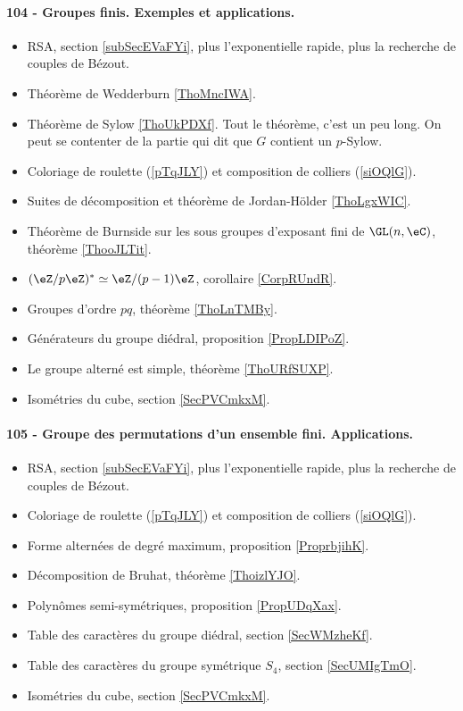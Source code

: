 \paragraph{104 - Groupes finis. Exemples et applications.}
\begin{itemize}
    \item RSA, section \ref{subSecEVaFYi}, plus l'exponentielle rapide, plus la recherche de couples de Bézout.
    \item Théorème de Wedderburn \ref{ThoMncIWA}.
    \item Théorème de Sylow \ref{ThoUkPDXf}. Tout le théorème, c'est un peu long. On peut se contenter de la partie qui dit que \( G\) contient un \( p\)-Sylow.
    \item Coloriage de roulette (\ref{pTqJLY}) et composition de colliers (\ref{siOQlG}).
    \item Suites de décomposition et théorème de Jordan-Hölder \ref{ThoLgxWIC}.
    \item Théorème de Burnside sur les sous groupes d'exposant fini de \( \GL(n,\eC)\), théorème \ref{ThooJLTit}.
    \item \( (\eZ/p\eZ)^*\simeq \eZ/(p-1)\eZ\), corollaire \ref{CorpRUndR}.
    \item Groupes d'ordre \( pq\), théorème \ref{ThoLnTMBy}.
    \item Générateurs du groupe diédral, proposition \ref{PropLDIPoZ}.
    \item Le groupe alterné est simple, théorème \ref{ThoURfSUXP}.
    \item Isométries du cube, section \ref{SecPVCmkxM}.
\end{itemize}

\paragraph{105 - Groupe des permutations d’un ensemble fini. Applications.}
\begin{itemize}
    \item RSA, section \ref{subSecEVaFYi}, plus l'exponentielle rapide, plus la recherche de couples de Bézout.
    \item Coloriage de roulette (\ref{pTqJLY}) et composition de colliers (\ref{siOQlG}).
    \item Forme alternées de degré maximum, proposition \ref{ProprbjihK}.
    \item Décomposition de Bruhat, théorème \ref{ThoizlYJO}.
    \item Polynômes semi-symétriques, proposition \ref{PropUDqXax}.
    \item Table des caractères du groupe diédral, section \ref{SecWMzheKf}.
    \item Table des caractères du groupe symétrique \( S_4\), section \ref{SecUMIgTmO}.
    \item Isométries du cube, section \ref{SecPVCmkxM}.
\end{itemize}

